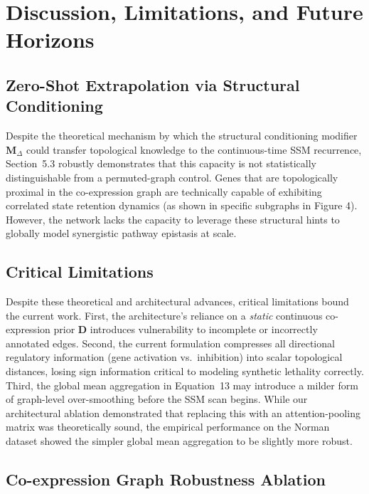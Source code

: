 \documentclass{bioinfo}
\begin{document}
\section{Discussion, Limitations, and Future Horizons}
\subsection{Zero-Shot Extrapolation via Structural Conditioning}

Despite the theoretical mechanism by which the structural conditioning modifier $\mathbf{M}_\Delta$ could transfer topological knowledge to the continuous-time SSM recurrence, Section~5.3 robustly demonstrates that this capacity is not statistically distinguishable from a permuted-graph control. Genes that are topologically proximal in the co-expression graph are technically capable of exhibiting correlated state retention dynamics (as shown in specific subgraphs in Figure 4). However, the network lacks the capacity to leverage these structural hints to globally model synergistic pathway epistasis at scale.

\subsection{Critical Limitations}

Despite these theoretical and architectural advances, critical limitations bound the current work. First, the architecture's reliance on a \textit{static} continuous co-expression prior $\mathbf{D}$ introduces vulnerability to incomplete or incorrectly annotated edges. Second, the current formulation compresses all directional regulatory information (gene activation vs.\ inhibition) into scalar topological distances, losing sign information critical to modeling synthetic lethality correctly. Third, the global mean aggregation in Equation~13 may introduce a milder form of graph-level over-smoothing before the SSM scan begins. While our architectural ablation demonstrated that replacing this with an attention-pooling matrix was theoretically sound, the empirical performance on the Norman dataset showed the simpler global mean aggregation to be slightly more robust.

\subsection{Co-expression Graph Robustness Ablation}
\end{document}
